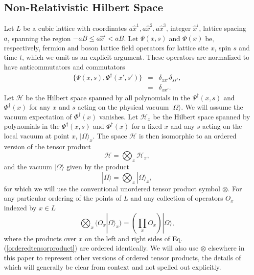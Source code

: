 \documentclass[twocolumn,amsmath,amssymb]{revtex4-1}
\begin{document}
\subsection{\label{subsec:hilbertspace} Non-Relativistic Hilbert Space}


Let $L$ be a cubic lattice with coordinates $a\hat{x}^1, a\hat{x}^2, a\hat{x}^3$, integer $\hat{x}^i$, lattice spacing $a$, 
spanning the region $-aB \leq a\hat{x}^i < aB$.
Let $\Psi( x, s)$ and $\Phi( x)$ be, respectively, fermion and
boson lattice field operators for lattice site $x$, spin $s$ and time $t$,
which we omit as an explicit argument.
These operators are normalized to have anticommutators and commutators
\begin{subequations}
\begin{eqnarray}
  \label{normpsi}
  \{ \Psi( x, s), \Psi^{\dagger}( x', s') \} &=& \delta_{xx'} \delta_{ss'}, \\
    \label{normphi}
[ \Phi( x), \Phi^{\dagger}( x')] &=& \delta_{xx'}.
\end{eqnarray}
\end{subequations}
Let $\mathcal{H}$ be the Hilbert space spanned by all polynomials in
the $\Psi^{\dagger}( x, s)$ and $\Phi^{\dagger}( x)$ for any $x$ and $s$ acting on the physical vacuum $|\Omega \rangle $.
We will assume the vacuum expectation of $\Phi^{\dagger}(x)$ vanishes.
Let $\mathcal{H}_x$ be the Hilbert space spanned by polynomials in 
the $\Psi^{\dagger}( x, s)$ and $\Phi^{\dagger}( x)$ for a fixed $x$ and any $s$ acting on  the local
vacuum at point $x$, $|\Omega \rangle _x$.
The space $\mathcal{H}$ is then isomorphic to an ordered version of the tensor product
\begin{equation}\label{tensorproduct}
\mathcal{H} = \bigotimes_x \mathcal{H}_x,
\end{equation}
and the vacuum $|\Omega \rangle $ given by the product
\begin{equation}\label{tensorproductvacuum}
|\Omega \rangle  = \bigotimes_x |\Omega \rangle _x,
\end{equation}
for which we will use the conventional unordered tensor product symbol $\otimes$.
For any particular ordering of the points of $L$ and any collection of
operators $O_x$ indexed by $x \in L$
\begin{equation}\label{orderedtensorproduct}
  \bigotimes_x (O_x |\Omega \rangle _x) = (\prod_x O_x) |\Omega \rangle ,
\end{equation}
where the products over $x$ on the left and right sides of Eq. (\ref{orderedtensorproduct})
are ordered identically.
We will also use $\otimes$ elsewhere in this paper to represent other versions of ordered
tensor products, the details of which will generally be clear from context and not
spelled out explicitly.
\end{document}
